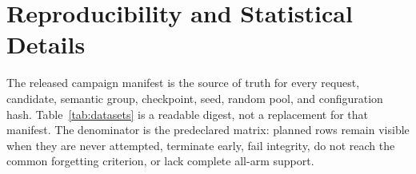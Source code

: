 
\section{Reproducibility and Statistical Details}
\label{app:evaluation-contract}
\label{app:datasets}
\label{app:objectives}

The released campaign manifest is the source of truth for every request,
candidate, semantic group, checkpoint, seed, random pool, and configuration
hash. Table~\ref{tab:datasets} is a readable digest, not a replacement for
that manifest. The denominator is the predeclared matrix: planned rows remain
visible when they are never attempted, terminate early, fail integrity, do not
reach the common forgetting criterion, or lack complete all-arm support.

